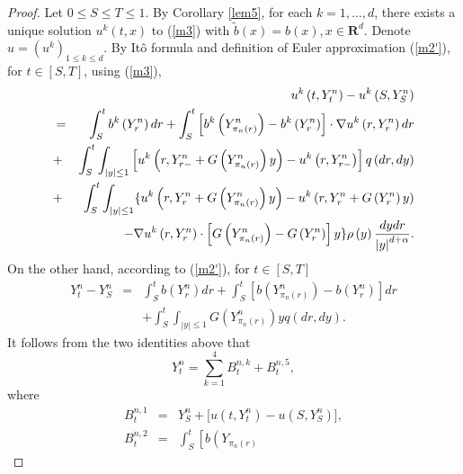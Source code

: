 \documentclass[11pt]{amsart}
\theoremstyle{plain}
\numberwithin{equation}{section}
\begin{document}
\begin{proof}
Let $0\leq S\leq T\leq 1$. By Corollary \ref{lem5}, for each $k=1,\ldots ,d$, there exists a unique solution $u^{k}\left( t,x\right) $ to (\ref{m3})
with $\tilde{b}\left( x\right) =b\left( x\right) ,x\in \mathbf{R}^{d}.$
Denote $u=\left( u^{k}\right) _{1\leq k\leq d}$. By It\^{o} formula and
definition of Euler approximation (\ref{m2'}), for $t\in \left[ S,T\right] $, using (\ref{m3}), 
\begin{eqnarray}
&&u^{k}\left( t,Y_{t}^{n}\right) -u^{k}\left( S,Y_{S}^{n}\right)  \notag \\
&=&\int_{S}^{t}b^{k}\left( Y_{r}^{n}\right) dr+\int_{S}^{t}\left[
b^{k}\left( Y_{\pi _{n}\left( r\right) }^{n}\right) -b^{k}\left(
Y_{r}^{n}\right) \right] \cdot \nabla u^{k}\left( r,Y_{r}^{n}\right) dr 
\notag \\
&+&\int_{S}^{t}\int_{\left\vert y\right\vert \leq 1}\left[ u^{k}\left(
r,Y_{r-}^{n}+G\left( Y_{\pi _{n}\left( r\right) }^{n}\right) y\right)
-u^{k}\left( r,Y_{r-}^{n}\right) \right] q\left( dr,dy\right)  \notag \\
&+&\int_{S}^{t}\int_{\left\vert y\right\vert \leq 1}\{u^{k}\left(
r,Y_{r}^{n}+G\left( Y_{\pi _{n}\left( r\right) }^{n}\right) y\right)
-u^{k}\left( r,Y_{r}^{n}+G\left( Y_{r}^{n}\right) y\right)  \notag \\
&&\quad -\nabla u^{k}\left( r,Y_{r}^{n}\right) \cdot \left[ G\left( Y_{\pi
_{n}\left( r\right) }^{n}\right) -G\left( Y_{r}^{n}\right) \right] y\}\rho
\left( y\right) \frac{dydr}{\left\vert y\right\vert ^{d+\alpha }}.  \notag
\end{eqnarray}On the other hand, according to (\ref{m2'}), for $t\in \left[ S,T\right] $ 
\begin{eqnarray*}
Y_{t}^{n}-Y_{S}^{n} &=& \int_{S}^{t}b\left( Y_{r}^{n}\right) dr+\int_{S}^{t} 
\left[ b\left( Y_{\pi _{n}\left( r\right) }^{n}\right) -b\left(
Y_{r}^{n}\right) \right] dr \\
&&+\int_{S}^{t}\int_{\left\vert y\right\vert \leq 1}G\left( Y_{\pi
_{n}\left( r\right) }^{n}\right) yq\left( dr,dy\right) .
\end{eqnarray*}It follows from the two identities above that\begin{equation*}
Y_{t}^{n}=\sum_{k=1}^{4}B_{t}^{n,k}+B_{t}^{n,5},
\end{equation*}where\begin{eqnarray*}
B_{t}^{n,1} &=&Y_{S}^{n}+\big[u\left( t,Y_{t}^{n}\right) -u\left(
S,Y_{S}^{n}\right) \big], \\
B_{t}^{n,2} &=&\int_{S}^{t}\left[ b\left( Y_{\pi _{n}\left( r\right)
}
\end{eqnarray*}
\end{proof}
\end{document}
